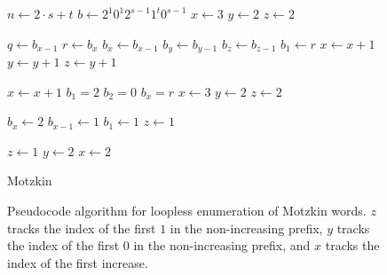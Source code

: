 \begin{figure}[H]
    \centering
        \begin{algorithm}[H]
        \begin{algorithmic}
        \EndFunction{}
         
        \State $n \gets 2 \cdot s+t$
        \State $b \gets 2^1 0^1 2^{s-1} 1^t 0^{s-1}$
        \State $x \gets 3$
        \State $y \gets 2$
        \State $z \gets 2$
        
        \State {}
        
            \State $q \gets b_{x-1}$
            \State $r \gets b_x$
            \vspace{.4em} 
            \State $b_x\gets b_{x-1}$
            \State $b_y\gets b_{y-1}$
            \State $b_z\gets b_{z-1}$
            \State $b_1\gets r$
            \vspace{.4em} 
            \State $x \gets x+1$
            \State $y \gets y+1$
            \State $z \gets y+1$
            
            \vspace{.4em} 
                    \State $x \gets x+1$
                \Else 
                    \State $b_1=2$
                    \State $b_2=0$
                    \State $b_x=r$
                    \State $x \gets 3$
                    \State $y \gets 2$
                    \State $z \gets 2$
                
                \EndIf
                    \State $b_x \gets 2$     
                    \State $b_{x-1} \gets 1$     
                    \State $b_1 \gets 1$     
                    \State $z \gets 1$     

                
            \EndIf
                \State $z \gets 1$
                \State $y \gets 2$
                \State $x \gets 2$
            \EndIf
        \EndWhile
        \end{algorithmic}
        \caption{Motzkin}
        \end{algorithm}
    \caption{Pseudocode algorithm for loopless enumeration of Motzkin words. $z$ tracks the index of the first $1$ in the non-increasing prefix, $y$ tracks the index of the first $0$ in the non-increasing prefix, and $x$ tracks the index of the first increase.}
    \label{fig:motzkinAlg}
\end{figure}
